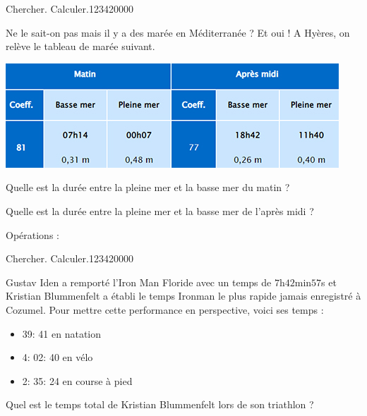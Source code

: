 \begin{pageParcourst}


\begin{ExoCt}{ Chercher. Calculer.}{1234}{2}{0}{0}{0}{0}
 
Ne le sait-on pas mais il y a des marée en Méditerranée ? Et oui ! A Hyères, on relève le tableau de marée suivant.

 \begin{minipage}{10cm}
\includegraphics[scale=0.7]{FIG/grandeurs_mesures/maree.jpg} 

Quelle est la durée entre la pleine mer et la basse mer du matin ? 

Quelle est la durée entre la pleine mer et la basse mer de l'après midi ? 


 \end{minipage}
\begin{minipage}{5cm}
  Opérations :
  \vspace{6cm}
\end{minipage}



 \end{ExoCt}

\begin{ExoCt}{ Chercher. Calculer.}{1234}{2}{0}{0}{0}{0}
 

Gustav Iden a remporté l’Iron Man Floride avec un temps de $7$h$42$min$57$s et Kristian Blummenfelt a établi le temps Ironman le plus rapide jamais enregistré à Cozumel. Pour mettre cette performance en perspective, voici ses temps :

\begin{itemize}
\item 39: 41 en natation
\item 4: 02: 40 en vélo
\item 2:  35: 24 en course à pied
\end{itemize}

Quel est le temps total de Kristian Blummenfelt lors de son triathlon ?

\end{ExoCt}


\end{pageParcourst}
